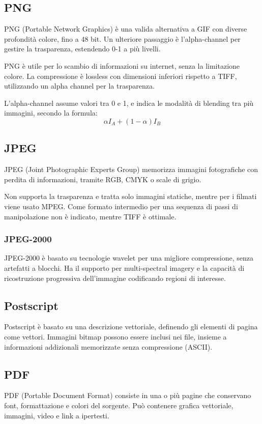  \subsection{PNG}
 PNG (Portable Network Graphics) è una valida alternativa a GIF con diverse profondità colore, fino a 48 bit. Un ulteriore passaggio è l'alpha-channel per gestire la trasparenza, estendendo 0-1 a più livelli. 
 
 PNG è utile per lo scambio di informazioni su internet, senza la limitazione colore. La compressione è lossless con dimensioni inferiori rispetto a TIFF, utilizzando un alpha channel per la trasparenza.
 
 L'alpha-channel assume valori tra 0 e 1, e indica le modalità di blending tra più immagini, secondo la formula:
 $$\alpha I_A + (1 - \alpha) I_B$$
 
 \subsection{JPEG}
 JPEG (Joint Photographic Experts Group) memorizza immagini fotografiche con perdita di informazioni, tramite RGB, CMYK o scale di grigio.
 
 Non supporta la trasparenza e tratta solo immagini statiche, mentre per i filmati viene usato MPEG. Come formato intermedio per una sequenza di passi di manipolazione non è indicato, mentre TIFF è ottimale.
 
 \subsubsection{JPEG-2000}
 JPEG-2000 è basato su tecnologie wavelet per una migliore compressione, senza artefatti a blocchi. Ha il supporto per multi-spectral imagery e la capacità di ricostruzione progressiva dell'immagine codificando regioni di interesse.
 
 \subsection{Postscript}
 Postscript è basato su una descrizione vettoriale, definendo gli elementi di pagina come vettori. Immagini bitmap possono essere inclusi nei file, insieme a informazioni addizionali memorizzate senza compressione (ASCII).
 
 \subsection{PDF}
 PDF (Portable Document Format) consiste in una o più pagine che conservano font, formattazione e colori del sorgente. Può contenere grafica vettoriale, immagini, video e link a ipertesti.
 

